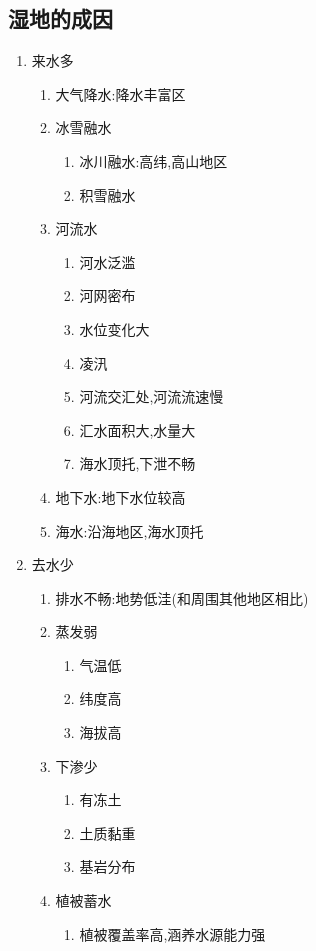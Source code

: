 \documentclass[a4paper]{article}
\begin{document}
    \subsection{湿地的成因}
    \begin{enumerate}
        \item 来水多
        \begin{enumerate}
            \item 大气降水:降水丰富区
            \item 冰雪融水
            \begin{enumerate}
                \item 冰川融水:高纬,高山地区
                \item 积雪融水
            \end{enumerate}
            \item 河流水
            \begin{enumerate}
                \item 河水泛滥
                    \item 河网密布
                    \item 水位变化大
                    \item 凌汛 %
                    \item 河流交汇处,河流流速慢
                    \item 汇水面积大,水量大
                    \item 海水顶托,下泄不畅
            \end{enumerate}
            \item 地下水:地下水位较高
            \item 海水:沿海地区,海水顶托
        \end{enumerate}
        \item 去水少
        \begin{enumerate}
            \item 排水不畅:地势低洼(和周围其他地区相比)
            \item 蒸发弱
            \begin{enumerate}
                \item 气温低
                    \item 纬度高
                    \item 海拔高
            \end{enumerate}
            \item 下渗少
            \begin{enumerate}
                \item 有冻土
                \item 土质黏重
                \item 基岩分布
            \end{enumerate}
            \item 植被蓄水
            \begin{enumerate}
                \item 植被覆盖率高,涵养水源能力强
            \end{enumerate}
        \end{enumerate}
    \end{enumerate}
\end{document}
